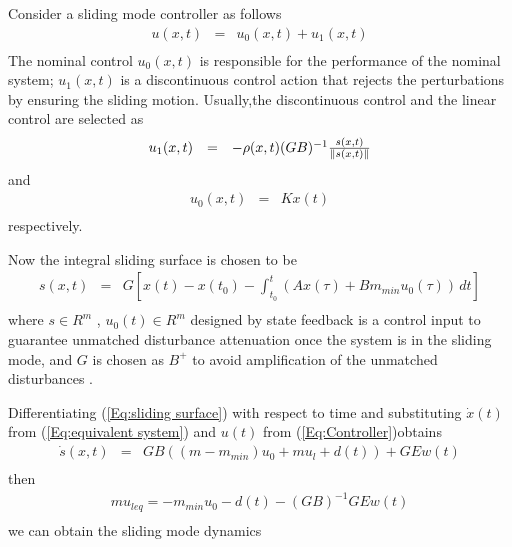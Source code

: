 \documentclass[journal,onecolumn]{IEEEtran}
\begin{document}
Consider a sliding mode controller as follows
\begin{equation}
\label{Eq:Controller}
\begin{array}{rcl}
u(x,t)&=&u_0(x,t)+u_1(x,t)\\[1mm]
\end{array}
\end{equation}
 The nominal control $u_0(x,t)$ is responsible for the performance of
 the nominal system; $u_1(x,t)$ is a discontinuous control action
 that rejects the perturbations by ensuring the sliding
 motion. Usually,the discontinuous control and the linear control are selected as
 \begin{equation}
\label{Eq:nonlinear Controller}
\begin{array}{rcl}
u_1(x,t)&=&-\rho(x,t)(GB)^{-1}{s(x,t)\over \|s(x,t)\|}\\[1mm]
\end{array}
\end{equation}
and
\begin{equation}
\label{Eq:linear Controller}
\begin{array}{rcl}
u_0(x,t)&=&Kx(t)\\[1mm]
\end{array}
\end{equation} respectively.




Now the integral sliding surface is chosen to be
 \begin{equation}
\label{Eq:sliding surface}
\begin{array}{rcl}
s(x,t)&=&G[x(t)-x(t_0)-\int_{t_0}^t(Ax(\tau)+B{m_{min}}u_0(\tau))\,dt]\\[1mm]
\end{array}
\end{equation}
where $s\in R^m$ , $u_0(t) \in R^m$ designed by state feedback
 is a control input to guarantee unmatched disturbance attenuation once the system is in the sliding
 mode, and $G$ is chosen as $B^+$ to avoid amplification of the
 unmatched disturbances \cite{24}.


Differentiating (\ref{Eq:sliding surface}) with respect to time and
substituting $\dot x(t)$ from (\ref{Eq:equivalent system}) and $u(t)
$ from  (\ref{Eq:Controller})obtains
\begin{equation*}
\label{Eq:sliding surface Difference}
\begin{array}{rcl}
\dot{s}(x,t)&=&GB((m-{m_{min}})u_0+mu_l+d(t))+GEw(t)\\[1mm]
\end{array}
\end{equation*}
then
\begin{equation*}
\label{Eq:1}
\begin{array}{rcl}
mu_{leq}=-{m_{min}}u_0-d(t)-{(GB)}^{-1}GEw(t)\\[1mm]
\end{array}
\end{equation*}
we can obtain the sliding mode dynamics
\end{document}

